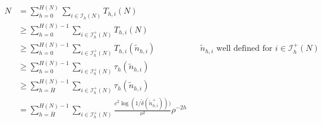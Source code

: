 \begin{align*}
    N & = \sum_{h=0}^{H(N)}\sum_{i\in\mathcal{I}_h(N)} T_{h,i}(N) \\
      &\geq \sum_{h=0}^{H(N)-1}\sum_{i\in\mathcal{I}_h^+(N)} T_{h,i}(N) \\
      & \geq \sum_{h=0}^{H(N)-1}\sum_{i\in\mathcal{I}_h^+(N)} T_{h,i}(\tilde{n}_{h,i}) && \text{$\tilde{n}_{h,i}$ well defined for $i\in\mathcal{I}_h^+(N)$} \\
      & \geq \sum_{h=0}^{H(N)-1}\sum_{i\in\mathcal{I}_h^+(N)} \tau_h(\tilde{n}_{h,i}) \\
      & \geq \sum_{h=\bar{H}}^{H(N)-1}\sum_{i\in\mathcal{I}_h^+(N)} \tau_h(\tilde{n}_{h,i}) \\
      & = \sum_{h=\bar{H}}^{H(N)-1}\sum_{i\in\mathcal{I}_h^+(N)} \frac{c^2\log(1/\tilde{\delta}(\tilde{n}_{h,i}^+)))}{\nu^2}\rho^{-2h}
         \end{align*}
